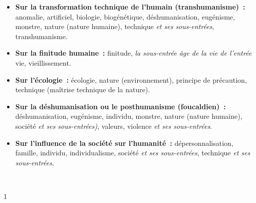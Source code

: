 \begin{itemize}\setlength{\itemsep}{6pt}

\item \textbf{Sur la transformation technique de l'humain (transhumanisme)~:} anomalie, artificiel, biologie, biogénétique, déshumanisation, eugénisme, monstre, nature (nature humaine), technique \textit{et ses sous-entrées}, transhumanisme.

\item \textbf{Sur la finitude humaine~:} finitude, \textit{la sous-entrée \emph{âge de la vie} de l'entrée} vie, vieillissement.

\item \textbf{Sur l'écologie~:} écologie, nature (environnement), principe de précaution, technique (maîtrise technique de la nature).

\item \textbf{Sur la déshumanisation ou le posthumanisme (foucaldien)~:} déshumanisation, eugénisme, individu, monstre, nature (nature humaine), société \textit{et ses sous-entrées)}, valeurs, violence \textit{et ses sous-entrées}.

\item \textbf{Sur l'influence de la société sur l'humanité~:}
dépersonnalisation, famille, individu, individualisme, société \textit{et ses sous-entrées}, technique \textit{et ses sous-entrées}.

\end{itemize}

\vfill{~}

\clearpage
\pagestyle{plain}
\cleardoublepage
\pagestyle{index}

\begin{spacing}{1}
\hypertarget{indexn}{}
%
\printindex[n]
\end{spacing}